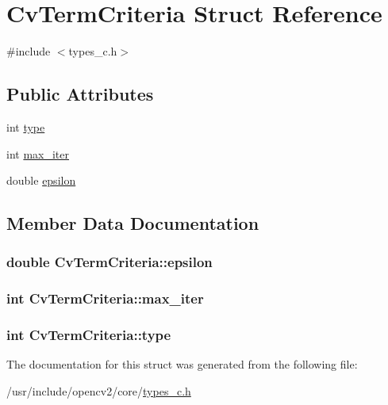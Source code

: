 \hypertarget{structCvTermCriteria}{\section{Cv\-Term\-Criteria Struct Reference}
\label{structCvTermCriteria}
}


{\ttfamily \#include $<$types\-\_\-c.\-h$>$}

\subsection*{Public Attributes}
\begin{DoxyCompactItemize}
\item 
int \hyperlink{structCvTermCriteria_a78bcb789341fdbd785b794b92555d6e0}{type}
\item 
int \hyperlink{structCvTermCriteria_a80e71461539848d9afb1d8cf7fa9a600}{max\-\_\-iter}
\item 
double \hyperlink{structCvTermCriteria_abf7169ca461d20aa2e4941b7d63102e6}{epsilon}
\end{DoxyCompactItemize}


\subsection{Member Data Documentation}
\hypertarget{structCvTermCriteria_abf7169ca461d20aa2e4941b7d63102e6}{
\subsubsection[{epsilon}]{\setlength{\rightskip}{0pt plus 5cm}double Cv\-Term\-Criteria\-::epsilon}}\label{structCvTermCriteria_abf7169ca461d20aa2e4941b7d63102e6}
\hypertarget{structCvTermCriteria_a80e71461539848d9afb1d8cf7fa9a600}{
\subsubsection[{max\-\_\-iter}]{\setlength{\rightskip}{0pt plus 5cm}int Cv\-Term\-Criteria\-::max\-\_\-iter}}\label{structCvTermCriteria_a80e71461539848d9afb1d8cf7fa9a600}
\hypertarget{structCvTermCriteria_a78bcb789341fdbd785b794b92555d6e0}{
\subsubsection[{type}]{\setlength{\rightskip}{0pt plus 5cm}int Cv\-Term\-Criteria\-::type}}\label{structCvTermCriteria_a78bcb789341fdbd785b794b92555d6e0}


The documentation for this struct was generated from the following file\-:\begin{DoxyCompactItemize}
\item 
/usr/include/opencv2/core/\hyperlink{core_2types__c_8h}{types\-\_\-c.\-h}\end{DoxyCompactItemize}
